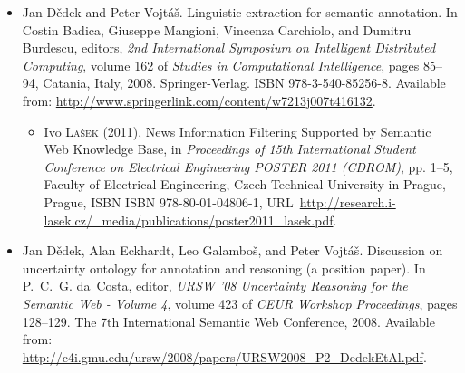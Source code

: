 \documentclass[12pt,a4paper,oneside,notitlepage]{article}
\newcommand{\urlprefix}{URL~}
\begin{document}
\begin{itemize}


\item
Jan D{\v{e}}dek and Peter Vojt{\'{a}}{\v{s}}.
\newblock Linguistic extraction for semantic annotation.
\newblock In Costin Badica, Giuseppe Mangioni, Vincenza Carchiolo, and Dumitru
  Burdescu, editors, {\em 2nd International Symposium on Intelligent
  Distributed Computing}, volume 162 of {\em Studies in Computational
  Intelligence}, pages 85--94, Catania, Italy, 2008. Springer-Verlag.
\newblock ISBN 978-3-540-85256-8.
\newblock Available from:
  \url{http://www.springerlink.com/content/w7213j007t416132}.


\begin{itemize}
\item
Ivo \textsc{La\v{s}ek} (2011), News Information Filtering Supported by Semantic
  Web Knowledge Base, in \emph{{Proceedings of 15th International Student
  Conference on Electrical Engineering POSTER 2011 (CDROM)}}, pp. 1--5, Faculty
  of Electrical Engineering, Czech Technical University in Prague, Prague, ISBN
  ISBN 978-80-01-04806-1,
  \urlprefix\url{http://research.i-lasek.cz/_media/publications/poster2011_lasek.pdf}.


\end{itemize}



\item
Jan D{\v{e}}dek, Alan Eckhardt, Leo Galambo{\v{s}}, and Peter
  Vojt{\'{a}}{\v{s}}.
\newblock Discussion on uncertainty ontology for annotation and reasoning (a
  position paper).
\newblock In P.~C.~G. da~Costa, editor, {\em {URSW} '08 Uncertainty Reasoning
  for the Semantic Web - Volume 4}, volume 423 of {\em {CEUR} Workshop
  Proceedings}, pages 128--129. The 7th International Semantic Web Conference,
  2008.
\newblock Available from:
  \url{http://c4i.gmu.edu/ursw/2008/papers/URSW2008_P2_DedekEtAl.pdf}.


\end{itemize}
\end{document}
